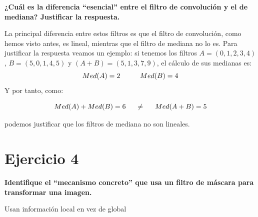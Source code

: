 \documentclass[11pt,a4paper]{article}
\begin{document}
\textbf{¿Cuál es la diferencia “esencial” entre el filtro de convolución y el de mediana? Justificar la respuesta.}

La principal diferencia entre estos filtros es que el filtro de convolución, como hemos visto antes, es lineal, mientras que el
filtro de mediana no lo es. Para justificar la respuesta veamos un ejemplo: si tenemos los filtros $A=(0,1,2,3,4)$, $B=(5,0,1,4,5)$
y $(A+B)=(5,1,3,7,9)$, el cálculo de sus medianas es:
\begin{equation}
Med(A) = 2 \hspace{10mm} Med(B) = 4
\end{equation}
Y por tanto, como:

\begin{equation}
Med(A)+Med(B)=6 \hspace{5mm} \neq \hspace{5mm} Med(A+B)=5
\end{equation}

podemos justificar que los filtros de mediana no son lineales.

\newpage


\section*{Ejercicio 4}

\textbf{Identifique el “mecanismo concreto” que usa un filtro de máscara para transformar una imagen.}

Usan información local en vez de global
\end{document}
